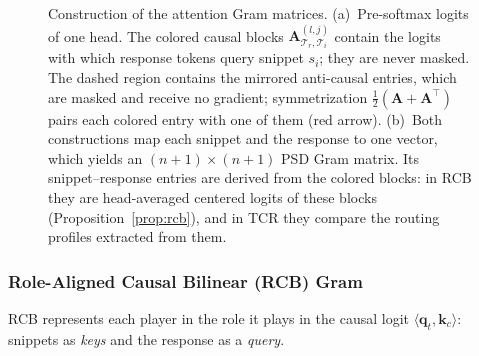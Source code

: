 \documentclass{article}
\begin{document}
\begin{figure}[t]
{%
}
\caption{Construction of the attention Gram matrices. (a)~Pre-softmax logits of one head. The colored causal blocks $\mathbf{A}^{(l,j)}_{\mathcal{T}_r, \mathcal{T}_i}$ contain the logits with which response tokens query snippet $s_i$; they are never masked. The dashed region contains the mirrored anti-causal entries, which are masked and receive no gradient; symmetrization $\frac{1}{2}(\mathbf{A} + \mathbf{A}^\top)$ pairs each colored entry with one of them (red arrow). (b)~Both constructions map each snippet and the response to one vector, which yields an $(n+1) \times (n+1)$ PSD Gram matrix. Its snippet--response entries are derived from the colored blocks: in RCB they are head-averaged centered logits of these blocks (Proposition~\ref{prop:rcb}), and in TCR they compare the routing profiles extracted from them.}
\label{fig:gram_construction}
\end{figure}

\subsubsection{Role-Aligned Causal Bilinear (RCB) Gram}
\label{subsubsec:rcb}

RCB represents each player in the role it plays in the causal logit $\langle \mathbf{q}_t, \mathbf{k}_c \rangle$: snippets as \emph{keys} and the response as a \emph{query}.
\end{document}
